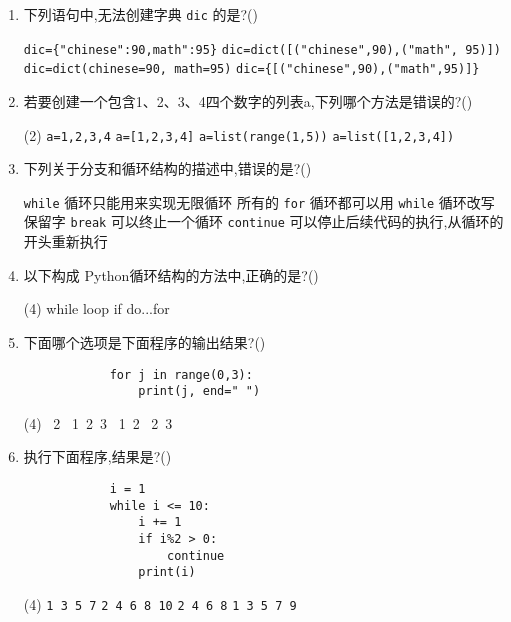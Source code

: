 \documentclass[11pt]{ctexart}
\begin{document}
\begin{enumerate}
        \item 下列语句中,无法创建字典 \lstinline{dic} 的是?(\qquad)
        \begin{tasks}
            \task \lstinline!dic={"chinese":90,math":95}!
            \task \lstinline!dic=dict([("chinese",90),("math", 95)])!
            \task \lstinline!dic=dict(chinese=90, math=95)!
            \task \lstinline!dic={[("chinese",90),("math",95)]}!
        \end{tasks}

        \item 若要创建一个包含1、2、3、4四个数字的列表a,下列哪个方法是错误的?(\qquad)
        \begin{tasks}(2)
            \task \lstinline!a=1,2,3,4!
            \task \lstinline!a=[1,2,3,4]!
            \task \lstinline!a=list(range(1,5))!
            \task \lstinline!a=list([1,2,3,4])!
        \end{tasks}

        \item 下列关于分支和循环结构的描述中,错误的是?(\qquad)
        \begin{tasks}
            \task \lstinline{while} 循环只能用来实现无限循环
            \task 所有的 \lstinline{for} 循环都可以用 \lstinline{while} 循环改写
            \task 保留字 \lstinline{break} 可以终止一个循环
            \task \lstinline{continue} 可以停止后续代码的执行,从循环的开头重新执行
        \end{tasks}

        \item 以下构成 Python循环结构的方法中,正确的是?(\qquad)
        \begin{tasks}(4)
            \task while
            \task loop
            \task if
            \task do...for
        \end{tasks}

        \item 下面哪个选项是下面程序的输出结果?(\qquad)
        \begin{lstlisting}
            for j in range(0,3):
                print(j, end=" ")
        \end{lstlisting}
        \begin{tasks}(4)
            ~2
            ~1~2~3
            ~1~2
            ~2~3
        \end{tasks}

        \newpage
        \item 执行下面程序,结果是?(\qquad)
        \begin{lstlisting}
            i = 1
            while i <= 10:
                i += 1
                if i%2 > 0:
                    continue
                print(i)
        \end{lstlisting}
        \begin{tasks}(4)
            \task \lstinline{1 3 5 7}
            \task \lstinline{2 4 6 8 10}
            \task \lstinline{2 4 6 8}
            \task \lstinline{1 3 5 7 9}
        \end{tasks}


\end{enumerate}
\end{document}

